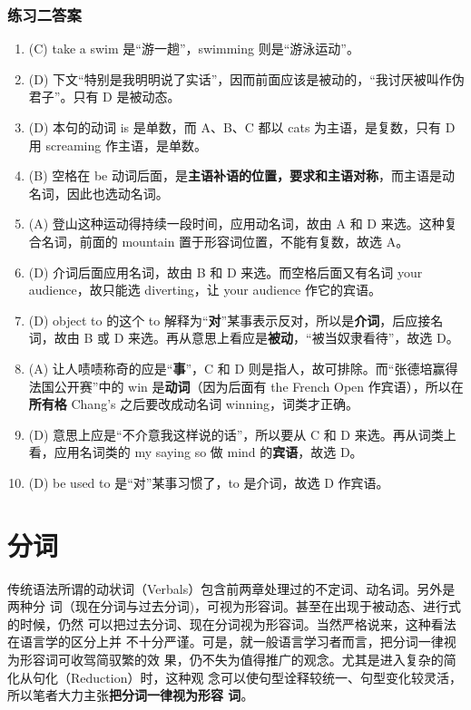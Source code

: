 \subsection{练习二答案}

\begin{enumerate}
\item (C) take a swim 是“游一趟”，swimming 则是“游泳运动”。
\item (D) 下文“特别是我明明说了实话”，因而前面应该是被动的，“我讨厌被叫作伪君子”。只有 D 是被动态。
\item (D) 本句的动词 is 是单数，而 A、B、C 都以 cats 为主语，是复数，只有 D 用 screaming 作主语，是单数。
\item (B) 空格在 be 动词后面，是\textbf{主语补语的位置，要求和主语对称}，而主语是动名词，因此也选动名词。
\item (A) 登山这种运动得持续一段时间，应用动名词，故由 A 和 D 来选。这种复合名词，前面的 mountain 置于形容词位置，不能有复数，故选 A。
\item (D) 介词后面应用名词，故由 B 和 D 来选。而空格后面又有名词 your audience，故只能选 diverting，让 your audience 作它的宾语。
\item (D) object to 的这个 to 解释为“\textbf{对}”某事表示反对，所以是\textbf{介词}，后应接名词，故由 B 或 D 来选。再从意思上看应是\textbf{被动}，“被当奴隶看待”，故选 D。
\item (A) 让人啧啧称奇的应是“\textbf{事}”，C 和 D 则是指人，故可排除。而“张德培赢得法国公开赛”中的 win 是\textbf{动词}（因为后面有 the French Open 作宾语），所以在\textbf{所有格} Chang's 之后要改成动名词 winning，词类才正确。
\item (D) 意思上应是“不介意我这样说的话”，所以要从 C 和 D 来选。再从词类上看，应用名词类的 my saying so 做 mind 的\textbf{宾语}，故选 D。
\item (D) be used to 是“对”某事习惯了，to 是介词，故选 D 作宾语。
\end{enumerate}


\chapter{分词}

传统语法所谓的动状词（Verbals）包含前两章处理过的不定词、动名词。另外是两种分
词（现在分词与过去分词)，可视为形容词。甚至在出现于被动态、进行式的时候，仍然
可以把过去分词、现在分词视为形容词。当然严格说来，这种看法在语言学的区分上并
不十分严谨。可是，就一般语言学习者而言，把分词一律视为形容词可收驾简驭繁的效
果，仍不失为值得推广的观念。尤其是进入复杂的简化从句化（Reduction）时，这种观
念可以使句型诠释较统一、句型变化较灵活，所以笔者大力主张\textbf{把分词一律视为形容
  词}。

